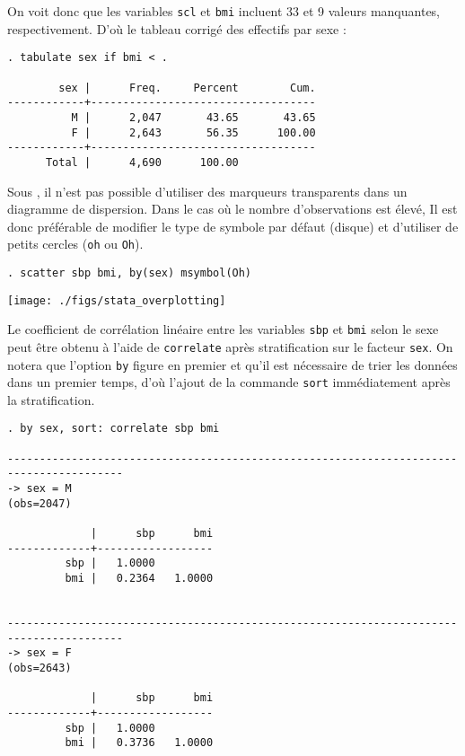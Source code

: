On voit donc que les variables \texttt{scl} et \texttt{bmi} incluent 33 et 9
valeurs manquantes, respectivement. D'où le tableau corrigé des effectifs
par sexe :
\begin{verbatim}
. tabulate sex if bmi < .

        sex |      Freq.     Percent        Cum.
------------+-----------------------------------
          M |      2,047       43.65       43.65
          F |      2,643       56.35      100.00
------------+-----------------------------------
      Total |      4,690      100.00
\end{verbatim}

Sous \Stata, il n'est pas possible d'utiliser des marqueurs transparents dans
un diagramme de dispersion. Dans le cas où le nombre d'observations est
élevé, Il est donc préférable de modifier le type de symbole par défaut
(disque) et d'utiliser de petits cercles (\texttt{oh} ou \texttt{Oh}).
\begin{verbatim}
. scatter sbp bmi, by(sex) msymbol(Oh)
\end{verbatim}

\texttt{[image: ./figs/stata\_overplotting]}

Le coefficient de corrélation linéaire entre les variables \texttt{sbp} et
\texttt{bmi} selon le sexe peut être obtenu à l'aide de \texttt{correlate}
après stratification sur le facteur \texttt{sex}. On notera que l'option
\texttt{by} figure en premier et qu'il est nécessaire de trier les données
dans un premier temps, d'où l'ajout de la commande \texttt{sort}
immédiatement après la stratification.
\begin{verbatim}
. by sex, sort: correlate sbp bmi

----------------------------------------------------------------------------------------
-> sex = M
(obs=2047)

             |      sbp      bmi
-------------+------------------
         sbp |   1.0000
         bmi |   0.2364   1.0000


----------------------------------------------------------------------------------------
-> sex = F
(obs=2643)

             |      sbp      bmi
-------------+------------------
         sbp |   1.0000
         bmi |   0.3736   1.0000
\end{verbatim}


